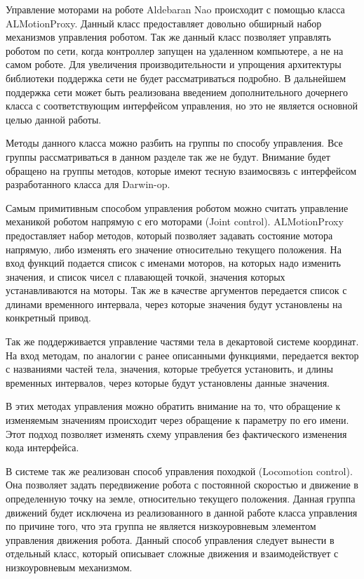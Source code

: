 Управление моторами на роботе Aldebaran Nao происходит с помощью класса ALMotionProxy. Данный класс предоставляет довольно обширный набор механизмов управления роботом. Так же данный класс позволяет управлять роботом по сети, когда контроллер запущен на удаленном компьютере, а не на самом роботе. Для увеличения производительности и упрощения архитектуры библиотеки поддержка сети не будет рассматриваться подробно. В дальнейшем поддержка сети может быть реализована введением дополнительного дочернего класса с соответствующим интерфейсом управления, но это не является основной целью данной работы.

Методы данного класса можно разбить на группы по способу управления. Все группы рассматриваться в данном разделе так же не будут. Внимание будет обращено на группы методов, которые имеют тесную взаимосвязь с интерфейсом разработанного класса для Darwin-op.

Самым примитивным способом управления роботом можно считать управление механикой роботом напрямую с его  моторами (Joint control).  ALMotionProxy предоставляет набор методов, который позволяет задавать состояние мотора напрямую, либо изменять его значение относительно текущего положения. На вход функций подается список с именами моторов, на которых надо изменить значения, и список чисел с плавающей точкой, значения которых устанавливаются на моторы. Так же в качестве аргументов передается список с длинами временного интервала, через которые значения будут установлены на конкретный привод.

Так же поддерживается управление частями тела в декартовой системе координат. На вход методам, по аналогии с ранее описанными функциями, передается вектор с названиями частей тела, значения, которые требуется установить, и длины временных интервалов, через которые будут установлены данные значения.

В этих методах управления можно обратить внимание на то, что обращение к изменяемым значениям происходит через обращение к параметру по его имени. Этот подход позволяет изменять схему управления без фактического изменения кода интерфейса.

В системе так же реализован способ управления походкой (Locomotion control). Она позволяет задать передвижение робота с постоянной скоростью и движение в определенную точку на земле, относительно текущего положения. Данная группа движений будет исключена из реализованного в данной работе класса управления по причине того, что эта группа не является низкоуровневым элементом управления движения робота. Данный способ управления следует вынести в отдельный класс, который описывает сложные движения и взаимодействует с низкоуровневым механизмом.

